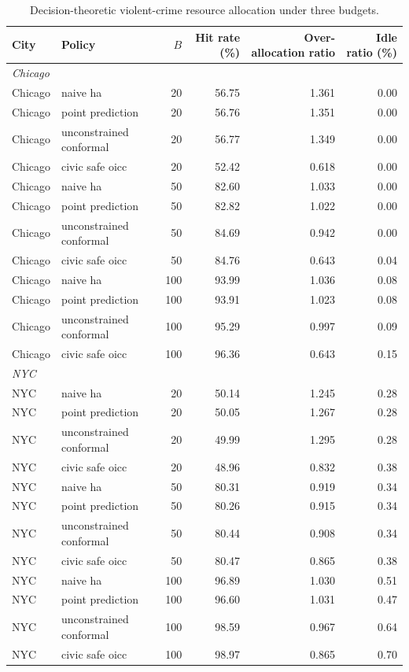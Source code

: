 \begin{table}[htbp]
\centering
\caption{Decision-theoretic violent-crime resource allocation under three budgets.}
\label{tab:policy-simulation}
\begin{tabular}{llrrrr}
\toprule
City & Policy & $B$ & Hit rate (\%) & Over-allocation ratio & Idle ratio (\%) \\
\midrule
\multicolumn{6}{l}{\textit{Chicago}} \\
\midrule
Chicago & naive ha & 20 & 56.75 & 1.361 & 0.00 \\
Chicago & point prediction & 20 & 56.76 & 1.351 & 0.00 \\
Chicago & unconstrained conformal & 20 & 56.77 & 1.349 & 0.00 \\
Chicago & civic safe oicc & 20 & 52.42 & 0.618 & 0.00 \\
Chicago & naive ha & 50 & 82.60 & 1.033 & 0.00 \\
Chicago & point prediction & 50 & 82.82 & 1.022 & 0.00 \\
Chicago & unconstrained conformal & 50 & 84.69 & 0.942 & 0.00 \\
Chicago & civic safe oicc & 50 & 84.76 & 0.643 & 0.04 \\
Chicago & naive ha & 100 & 93.99 & 1.036 & 0.08 \\
Chicago & point prediction & 100 & 93.91 & 1.023 & 0.08 \\
Chicago & unconstrained conformal & 100 & 95.29 & 0.997 & 0.09 \\
Chicago & civic safe oicc & 100 & 96.36 & 0.643 & 0.15 \\
\multicolumn{6}{l}{\textit{NYC}} \\
\midrule
NYC & naive ha & 20 & 50.14 & 1.245 & 0.28 \\
NYC & point prediction & 20 & 50.05 & 1.267 & 0.28 \\
NYC & unconstrained conformal & 20 & 49.99 & 1.295 & 0.28 \\
NYC & civic safe oicc & 20 & 48.96 & 0.832 & 0.38 \\
NYC & naive ha & 50 & 80.31 & 0.919 & 0.34 \\
NYC & point prediction & 50 & 80.26 & 0.915 & 0.34 \\
NYC & unconstrained conformal & 50 & 80.44 & 0.908 & 0.34 \\
NYC & civic safe oicc & 50 & 80.47 & 0.865 & 0.38 \\
NYC & naive ha & 100 & 96.89 & 1.030 & 0.51 \\
NYC & point prediction & 100 & 96.60 & 1.031 & 0.47 \\
NYC & unconstrained conformal & 100 & 98.59 & 0.967 & 0.64 \\
NYC & civic safe oicc & 100 & 98.97 & 0.865 & 0.70 \\
\bottomrule
\end{tabular}
\end{table}
